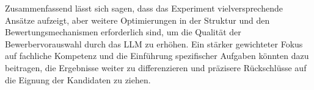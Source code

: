 Zusammenfassend lässt sich sagen, dass das Experiment vielversprechende Ansätze aufzeigt, aber weitere Optimierungen in der Struktur und den Bewertungsmechanismen erforderlich sind, um die Qualität der Bewerbervorauswahl durch das \acs{LLM} zu erhöhen. Ein stärker gewichteter Fokus auf fachliche Kompetenz und die Einführung spezifischer Aufgaben könnten dazu beitragen, die Ergebnisse weiter zu differenzieren und präzisere Rückschlüsse auf die Eignung der Kandidaten zu ziehen.